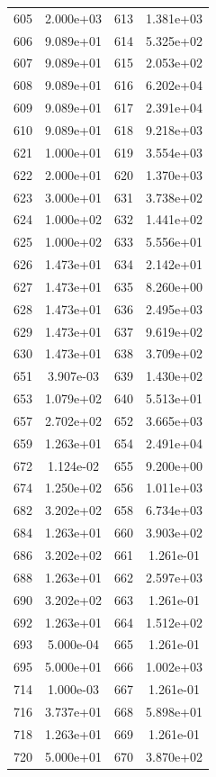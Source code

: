\documentclass[12pt]{article}
\begin{document}
\begin{longtable}{@{}cccc@{}}
605 & 2.000e+03 & 613 & 1.381e+03 \\
606 & 9.089e+01 & 614 & 5.325e+02 \\
607 & 9.089e+01 & 615 & 2.053e+02 \\
608 & 9.089e+01 & 616 & 6.202e+04 \\
609 & 9.089e+01 & 617 & 2.391e+04 \\
610 & 9.089e+01 & 618 & 9.218e+03 \\
621 & 1.000e+01 & 619 & 3.554e+03 \\
622 & 2.000e+01 & 620 & 1.370e+03 \\
623 & 3.000e+01 & 631 & 3.738e+02 \\
624 & 1.000e+02 & 632 & 1.441e+02 \\
625 & 1.000e+02 & 633 & 5.556e+01 \\
626 & 1.473e+01 & 634 & 2.142e+01 \\
627 & 1.473e+01 & 635 & 8.260e+00 \\
628 & 1.473e+01 & 636 & 2.495e+03 \\
629 & 1.473e+01 & 637 & 9.619e+02 \\
630 & 1.473e+01 & 638 & 3.709e+02 \\
651 & 3.907e-03 & 639 & 1.430e+02 \\
653 & 1.079e+02 & 640 & 5.513e+01 \\
657 & 2.702e+02 & 652 & 3.665e+03 \\
659 & 1.263e+01 & 654 & 2.491e+04 \\
672 & 1.124e-02 & 655 & 9.200e+00 \\
674 & 1.250e+02 & 656 & 1.011e+03 \\
682 & 3.202e+02 & 658 & 6.734e+03 \\
684 & 1.263e+01 & 660 & 3.903e+02 \\
686 & 3.202e+02 & 661 & 1.261e-01 \\
688 & 1.263e+01 & 662 & 2.597e+03 \\
690 & 3.202e+02 & 663 & 1.261e-01 \\
692 & 1.263e+01 & 664 & 1.512e+02 \\
693 & 5.000e-04 & 665 & 1.261e-01 \\
695 & 5.000e+01 & 666 & 1.002e+03 \\
714 & 1.000e-03 & 667 & 1.261e-01 \\
716 & 3.737e+01 & 668 & 5.898e+01 \\
718 & 1.263e+01 & 669 & 1.261e-01 \\
720 & 5.000e+01 & 670 & 3.870e+02 \\

\end{longtable}
\end{document}

